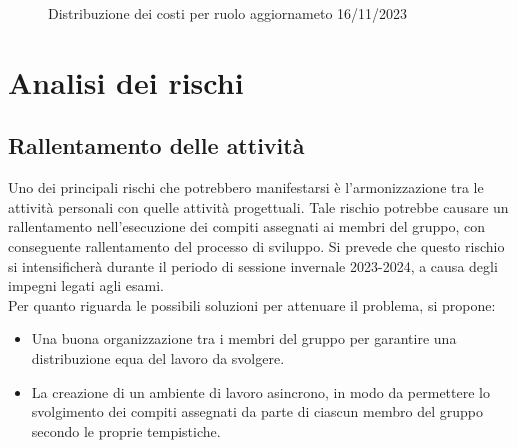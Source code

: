 \documentclass{article}
\begin{document}
\begin{figure}[h]
    \centering
    \caption{Distribuzione dei costi per ruolo aggiornameto 16/11/2023}
\end{figure}

\section{Analisi dei rischi} \label{sec:AnalisiRischi}
\subsection{Rallentamento delle attività}
Uno dei principali rischi che potrebbero manifestarsi è l'armonizzazione tra le attività personali con quelle attività progettuali. Tale rischio
potrebbe causare un rallentamento nell'esecuzione dei compiti assegnati ai membri del gruppo, con conseguente rallentamento del processo di sviluppo.
Si prevede che questo rischio si intensificherà durante il periodo di sessione invernale 2023-2024, a causa degli impegni legati agli esami.\\
Per quanto riguarda le possibili soluzioni per attenuare il problema, si propone:

\begin{itemize}
    \item Una buona organizzazione tra i membri del gruppo per garantire una distribuzione equa del lavoro da svolgere.
    \item La creazione di un ambiente di lavoro asincrono, in modo da permettere lo svolgimento dei compiti assegnati da parte di ciascun membro del gruppo secondo le proprie tempistiche.
\end{itemize}
\end{document}

